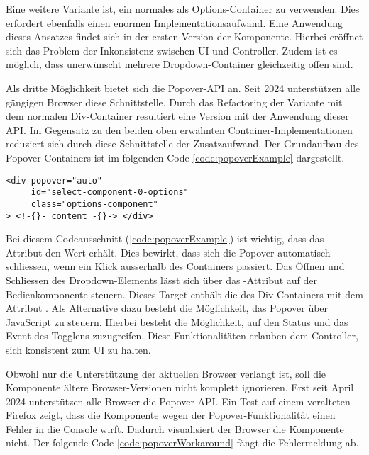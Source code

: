 Eine weitere Variante ist, ein normales  als Options-Container zu verwenden. 
Dies erfordert ebenfalls einen enormen Implementationsaufwand. 
Eine Anwendung dieses Ansatzes findet sich in der ersten Version der Komponente. 
Hierbei eröffnet sich das Problem der Inkonsistenz zwischen UI und Controller. 
Zudem ist es möglich, dass unerwünscht mehrere Dropdown-Container gleichzeitig offen sind. 

Als dritte Möglichkeit bietet sich die Popover-API an. 
Seit 2024 unterstützen alle gängigen Browser diese Schnittstelle. 
Durch das Refactoring der Variante mit dem normalen Div-Container resultiert eine Version mit der Anwendung dieser API. 
Im Gegensatz zu den beiden oben erwähnten Container-Implementationen reduziert sich durch diese Schnittstelle der Zusatzaufwand. 
Der Grundaufbau des Popover-Containers ist im folgenden Code \ref{code:popoverExample} dargestellt. 

\begin{lstlisting}[style = htmlcssjs, caption = Beispiel – Popover-Container, label = code:popoverExample]
<div popover="auto"
     id="select-component-0-options" 
     class="options-component" 
> <!-{}- content -{}-> </div>
\end{lstlisting}

Bei diesem Codeausschnitt (\ref{code:popoverExample}) ist wichtig, dass das Attribut  den Wert  erhält. 
Dies bewirkt, dass sich die Popover automatisch schliessen, wenn ein Klick ausserhalb des Containers passiert. 
Das Öffnen und Schliessen des Dropdown-Elements lässt sich über das -Attribut auf der Bedienkomponente steuern. 
Dieses Target enthält die  des Div-Containers mit dem Attribut . 
Als Alternative dazu besteht die Möglichkeit, das Popover über JavaScript zu steuern. 
Hierbei besteht die Möglichkeit, auf den Status und das Event des Togglens zuzugreifen. 
Diese Funktionalitäten erlauben dem Controller, sich konsistent zum UI zu halten. 

Obwohl nur die Unterstützung der aktuellen Browser verlangt ist, soll die Komponente ältere Browser-Versionen nicht komplett ignorieren. 
Erst seit April 2024 unterstützen alle Browser die Popover-API. 
Ein Test auf einem veralteten Firefox zeigt, dass die Komponente wegen der Popover-Funktionalität einen Fehler in die Console wirft.
Dadurch visualisiert der Browser die Komponente nicht. 
Der folgende Code \ref{code:popoverWorkaround} fängt die Fehlermeldung ab. 

